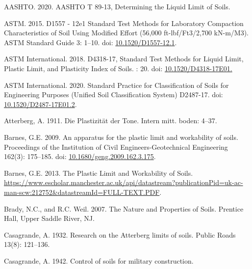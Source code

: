 \documentclass[
  letterpaper,
]{article}
\newlength{\cslhangindent}
\newlength{\cslentryspacingunit} %
\newenvironment{CSLReferences}[2] %
 {%
  \setlength{\parindent}{0pt}
  \ifodd #1
  \let\oldpar\par
  \def\par{\hangindent=\cslhangindent\oldpar}
  \fi
  \setlength{\parskip}{#2\cslentryspacingunit}
 }%
 {}
\begin{document}
\hypertarget{refs}{}
\begin{CSLReferences}{1}{0}
\leavevmode{}%
AASHTO. 2020. {AASHTO T} 89-13, {Determining} the {Liquid Limit} of {Soils}.

\leavevmode{}%
ASTM. 2015. D1557 - 12e1 {Standard Test Methods} for {Laboratory Compaction Characteristics} of {Soil Using Modified Effort} (56,000 ft-lbf/Ft3/2,700 {kN-m}/M3). ASTM Standard Guide 3: 1--10. doi: \href{https://doi.org/10.1520/D1557-12.1}{10.1520/D1557-12.1}.

\leavevmode{}%
ASTM International. 2018. D4318-17, {Standard Test Methods} for {Liquid Limit}, {Plastic Limit}, and {Plasticity Index} of {Soils}. : 20. doi: \href{https://doi.org/10.1520/D4318-17E01.}{10.1520/D4318-17E01.}

\leavevmode{}%
ASTM International. 2020. Standard {Practice} for {Classification} of {Soils} for {Engineering Purposes} ({Unified Soil Classification System}) {D2487-17}. doi: \href{https://doi.org/10.1520/D2487-17E01.2}{10.1520/D2487-17E01.2}.

\leavevmode{}%
Atterberg, A. 1911. Die {Plastizität} der {Tone}. Intern mitt. boden: 4--37.

\leavevmode{}%
Barnes, G.E. 2009. An apparatus for the plastic limit and workability of soils. Proceedings of the Institution of Civil Engineers-Geotechnical Engineering 162(3): 175--185. doi: \href{https://doi.org/10.1680/geng.2009.162.3.175}{10.1680/geng.2009.162.3.175}.

\leavevmode{}%
Barnes, G.E. 2013. The {Plastic Limit} and {Workability} of {Soils}. \url{https://www.escholar.manchester.ac.uk/api/datastream?publicationPid=uk-ac-man-scw:212752\&datastreamId=FULL-TEXT.PDF}.

\leavevmode{}%
Brady, N.C., and R.C. Weil. 2007. The {Nature} and {Properties} of {Soils}. {Prentice Hall}, {Upper Saddle River, NJ}.

\leavevmode{}%
Casagrande, A. 1932. Research on the {Atterberg} limits of soils. Public Roads 13(8): 121--136.

\leavevmode{}%
Casagrande, A. 1942. Control of soils for military construction.


\end{CSLReferences}
\end{document}

